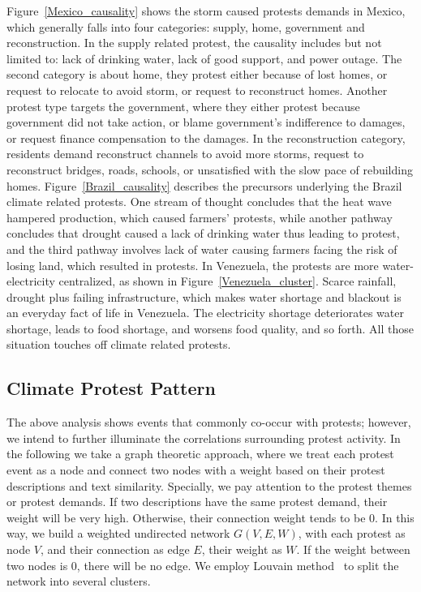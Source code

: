 Figure~\ref{Mexico_causality} shows the storm caused protests demands in Mexico, which generally falls into four categories: supply, home, government and reconstruction. In the supply related protest, the causality includes but not limited to: lack of drinking water, lack of good support, and power outage. The second category is about home, they protest either because of lost homes, or request to relocate to avoid storm, or request to reconstruct homes. Another protest type targets the government, where
they either protest because government did not take action, or blame government's indifference to damages, or request finance compensation to the damages. In the reconstruction category, residents demand reconstruct channels to avoid more storms, request to reconstruct bridges, roads, schools, or unsatisfied with the slow pace of rebuilding homes. Figure~\ref{Brazil_causality} describes the precursors underlying the Brazil climate related protests. One stream of
thought concludes that the heat wave hampered production, which caused farmers' protests, while another pathway concludes
that drought caused a lack of drinking water thus leading to protest, and the third pathway  involves lack of water causing farmers facing the risk of losing land, which resulted in protests. In Venezuela, the protests are more water-electricity centralized, as shown in Figure~\ref{Venezuela_cluster}. Scarce rainfall, drought plus failing infrastructure, which makes water shortage and blackout is an everyday fact of life in Venezuela. The electricity shortage deteriorates water shortage, leads to food shortage, and worsens food quality, and so forth. All those situation touches off climate related protests.


\subsection{Climate Protest Pattern}
The above analysis shows events that commonly co-occur with protests; however, we intend to further illuminate the correlations surrounding protest activity.
In the following we take a graph theoretic approach, where we treat each protest event as a node and connect two nodes with a weight based on their protest descriptions and text similarity. Specially, we pay attention to the protest themes or protest demands. If two descriptions have the same protest demand, their weight will be very high. Otherwise, their connection weight tends to be 0.
In this way, we build a weighted undirected network $G(V, E, W)$, with each protest as node $V$, and their connection as edge $E$, their weight as $W$. If the weight between two nodes is 0, there will be no edge. We employ Louvain method~\cite{blondel2008fast} to split the network into several clusters.


